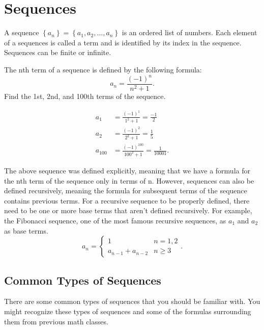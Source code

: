 \section{Sequences}
\begin{definition}
	A sequence $\left\{a_n\right\} = \left\{a_1, a_2, \ldots, a_n\right\}$ is an ordered list of numbers.
	Each element of a sequences is called a term and is identified by its index in the sequence.
	Sequences can be finite or infinite.
\end{definition}

\begin{example}
	The nth term of a sequence is defined by the following formula:
	\begin{equation*}
		a_n = \frac{(-1)^n}{n^2+1}.
	\end{equation*}
	Find the 1st, 2nd, and 100th terms of the sequence.
\end{example}
\begin{answer}
	\begin{align*}
		a_1 &= \frac{(-1)^1}{1^2 + 1} = \frac{-1}{2} \\
		a_2 &= \frac{(-1)^2}{2^2 + 1} = \frac{1}{5} \\
		a_{100} &= \frac{(-1)^{100}}{100^2 + 1} = \frac{1}{10001}.
	\end{align*}
\end{answer}

The above sequence was defined explicitly, meaning that we have a formula for the nth term of the sequence only in terms of n.
However, sequences can also be defined recursively, meaning the formula for subsequent terms of the sequence contains previous terms.
For a recursive sequence to be properly defined, there need to be one or more base terms that aren't defined recursively.
For example, the Fibonacci sequence, one of the most famous recursive sequences, as $a_1$ and $a_2$ as base terms.
\begin{equation*}
	a_n = \begin{cases}
		1 & n = 1, 2 \\
		a_{n-1} + a_{n-2} & n \geq 3
	\end{cases}.
\end{equation*}

\subsection{Common Types of Sequences}
There are some common types of sequences that you should be familiar with.
You might recognize these types of sequences and some of the formulas surrounding them from previous math classes.

